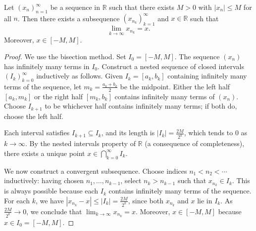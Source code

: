 \begin{theorem} \label{theorem:bolzano_weierstrass_theorem_stating_that_bounded_sequences_in_real_numbers_have_subsequences_that_converge_to_some_value}
    Let $(x_n)_{n=1}^\infty$ be a sequence in $\mathbb{R}$ such that there exists $M > 0$ with $|x_n| \leq M$ for all $n$. Then there exists a subsequence $(x_{n_k})_{k=1}^\infty$ and $x \in \mathbb{R}$ such that
    $$\lim_{k \to \infty} x_{n_k} = x.$$
     Moreover, $x \in [-M, M]$.
\end{theorem}

\begin{proof}
    We use the bisection method. Set $I_0 = [-M, M]$. The sequence $(x_n)$ has infinitely many terms in $I_0$. Construct a nested sequence of closed intervals $(I_k)_{k=0}^\infty$ inductively as follows. Given $I_k = [a_k, b_k]$ containing infinitely many terms of the sequence, let $m_k = \frac{a_k + b_k}{2}$ be the midpoint. Either the left half $[a_k, m_k]$ or the right half $[m_k, b_k]$ contains infinitely many terms of $(x_n)$. Choose $I_{k+1}$ to be whichever half contains infinitely many terms; if both do, choose the left half.

    Each interval satisfies $I_{k+1} \subseteq I_k$, and its length is $|I_k| = \frac{2M}{2^k}$, which tends to $0$ as $k \to \infty$. By the nested intervals property of $\mathbb{R}$ (a consequence of completeness), there exists a unique point $x \in \bigcap_{k=0}^\infty I_k$.

    We now construct a convergent subsequence. Choose indices $n_1 < n_2 < \cdots$ inductively: having chosen $n_1, \ldots, n_{k-1}$, select $n_k > n_{k-1}$ such that $x_{n_k} \in I_k$. This is always possible because each $I_k$ contains infinitely many terms of the sequence. For each $k$, we have $|x_{n_k} - x| \leq |I_k| = \frac{2M}{2^k}$, since both $x_{n_k}$ and $x$ lie in $I_k$. As $\frac{2M}{2^k} \to 0$, we conclude that $\lim_{k \to \infty} x_{n_k} = x$. Moreover, $x \in [-M, M]$ because $x \in I_0 = [-M, M]$.
\end{proof}
